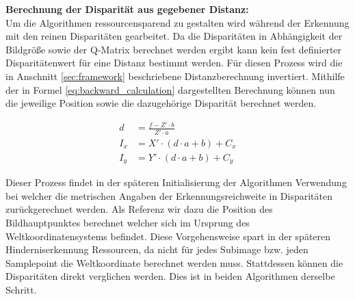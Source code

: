 	
\noindent
\textbf{Berechnung der Disparität aus gegebener Distanz:}\\
Um die Algorithmen ressourcensparend zu gestalten wird während der Erkennung mit den reinen Disparitäten gearbeitet. Da die Disparitäten in Abhängigkeit der Bildgröße sowie der Q-Matrix berechnet werden ergibt kann kein fest definierter Disparitätenwert für eine Distanz bestimmt werden. Für diesen Prozess wird die in Anschnitt \ref{sec:framework} beschriebene Distanzberechnung invertiert. Mithilfe der in Formel \ref{eq:backward_calculation} dargestellten Berechnung können nun die jeweilige Position sowie die dazugehörige Disparität berechnet werden. 

\begin{equation}
  \label{eq:backward_calculation}
  \begin{aligned}
    d &= \frac{f- Z' \cdot b}{Z' \cdot a}\\
    I_x &= X' \cdot (d \cdot a + b) + C_x\\
    I_y &= Y' \cdot (d \cdot a + b) + C_y
  \end{aligned}
\end{equation}

\noindent
Dieser Prozess findet in der späteren Initialisierung der Algorithmen Verwendung bei welcher die metrischen Angaben der Erkennungsreichweite in Disparitäten zurückgerechnet werden. Als Referenz wir dazu die Position des Bildhauptpunktes berechnet welcher sich im Ursprung des Weltkoordinatensystems befindet. Diese Vorgehensweise spart in der späteren Hinderniserkennung Ressourcen, da nicht für jedes Subimage bzw. jeden Samplepoint die Weltkoordinate berechnet werden muss. Stattdessen können die Disparitäten direkt verglichen werden. Dies ist in beiden Algorithmen derselbe Schritt.\\


